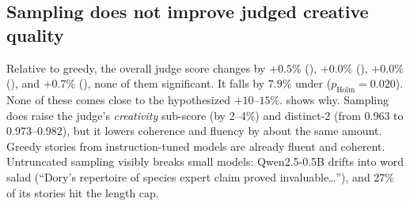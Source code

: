 \subsection{Sampling does not improve judged creative quality}
\label{sec:res-creative}



 Relative to greedy, the overall judge score changes by $+0.5\%$ (\tsev), $+0.0\%$ (\topp), $+0.0\%$ (\topk), and $+0.7\%$ (\minp), none of them significant. It falls by $7.9\%$ under \tone ($p_{\text{Holm}}=0.020$). None of these comes close to the hypothesized $+10$--$15\%$.  shows why. Sampling does raise the judge's \emph{creativity} sub-score (by 2--4\%) and distinct-2 (from 0.963 to 0.973--0.982), but it lowers coherence and fluency by about the same amount. Greedy stories from instruction-tuned models are already fluent and coherent. Untruncated sampling visibly breaks small models: Qwen2.5-0.5B drifts into word salad (``Dory's repertoire of species expert claim proved invaluable\ldots''), and 27\% of its \tone stories hit the length cap.
